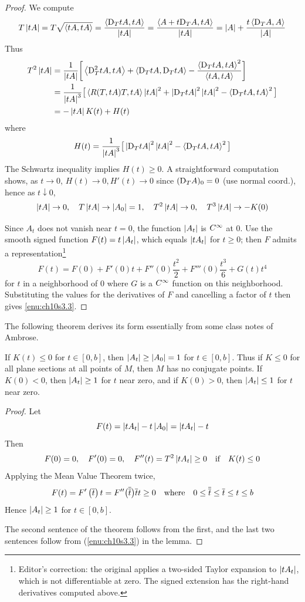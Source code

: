 \documentclass[../main]{subfiles}
\begin{document}
\begin{proof}
We compute
\[T\left|tA\right| = T\sqrt{\left\langle tA,tA\right\rangle}
= \frac{\left\langle\mathrm{D}_TtA,tA\right\rangle}{\left|tA\right|}
= \frac{\left\langle A+t\mathrm{D}_TA,tA\right\rangle}{\left|tA\right|}
= \left|A\right| + \frac{t\left\langle\mathrm{D}_TA,A\right\rangle}{\left|A\right|}\]
Thus
\begin{align*}
    T^2\left|tA\right| &= \frac{1}{\left|tA\right|}\bigg[\left\langle\mathrm{D}_T^2tA,tA\right\rangle + \left\langle\mathrm{D}_TtA,\mathrm{D}_TtA\right\rangle - \frac{\left\langle\mathrm{D}_TtA,tA\right\rangle^2}{\left\langle tA,tA\right\rangle}\bigg] \\
    &= \frac{1}{\left|tA\right|^3}\big[\left\langle R(T,tA)T,tA\right\rangle\left|tA\right|^2 + \left|\mathrm{D}_TtA\right|^2\left|tA\right|^2 - \left\langle\mathrm{D}_TtA,tA\right\rangle^2\big] \\
    &= -\left|tA\right|K(t) + H(t)
\end{align*}
where
\[H(t) = \frac{1}{\left|tA\right|^3}\big[\left|\mathrm{D}_TtA\right|^2\left|tA\right|^2 - \left\langle\mathrm{D}_TtA,tA\right\rangle^2\big]\]
The Schwartz inequality implies $H(t)\ge0$. A straightforward computation shows, as $t\to0$,
$H(t)\to0, H'(t)\to0$
since $(\mathrm{D}_TA)_0=0$ (use normal coord.), hence as $t\downarrow0$,
\[\left|tA\right|\to0,
\quad T\left|tA\right|\to\left|A_0\right|=1,
\quad T^2\left|tA\right|\to0,
\quad T^3\left|tA\right|\to-K(0)\]

Since $A_t$ does not vanish near $t=0$, the function $\left|A_t\right|$ is $C^\infty$ at 0. Use the smooth signed function $F(t)=t\left|A_t\right|$, which equals $\left|tA_t\right|$ for $t\ge0$; then $F$ admits a representation\footnote{Editor's correction: the original applies a two-sided Taylor expansion to $\left|tA_t\right|$, which is not differentiable at zero. The signed extension has the right-hand derivatives computed above.}
\[F(t) = F(0) + F'(0)t + F''(0)\frac{t^2}{2} + F'''(0)\frac{t^3}{6} + G(t)t^4\]
for $t$ in a neighborhood of 0 where $G$ is a $C^\infty$ function on this neighborhood. Substituting the values for the derivatives of $F$ and cancelling a factor of $t$ then gives \ref{enu:ch10s3.3}.
\end{proof}



The following theorem derives its form essentially from some class notes of Ambrose. 



\begin{theorem} \label{thm:ch10.3.2}
If $K(t)\le0$ for $t\in[0,b]$, then $\left|A_t\right|\ge\left|A_0\right|=1$ for $t\in[0,b]$. Thus if $K\le0$ for all plane sections at all points of $M$, then $M$ has no conjugate points. If $K(0)<0$, then $\left|A_t\right|\ge1$ for $t$ near zero, and if $K(0)>0$, then $\left|A_t\right|\le1$ for $t$ near zero.
\end{theorem}

\begin{proof}
Let
\[F(t) = \left|tA_t\right| - t\left|A_0\right|
= \left|tA_t\right| - t\]
Then
\[F(0)=0,
\quad F'(0)=0,
\quad F''(t)=T^2\left|tA_t\right|\ge0
\quad \text{if} \quad K(t)\le0\]
Applying the Mean Value Theorem twice,
\[F(t) = F'\left(\overline t\right)t
= F''\big(\overline{\overline t}\big)\overline tt\ge0
\quad \text{where} \quad 0\le\overline{\overline t}\le\overline t\le t\le b\]
Hence $\left|A_t\right|\ge1$ for $t\in[0,b]$.

The second sentence of the theorem follows from the first, and the last two sentences follow from (\ref{enu:ch10s3.3}) in the lemma.
\end{proof}
\end{document}
